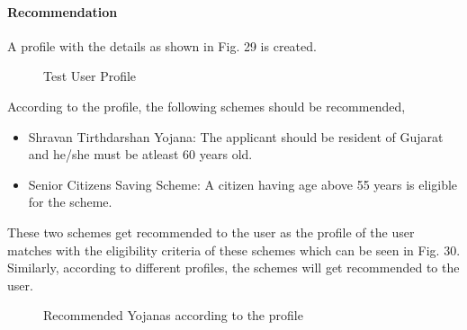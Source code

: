 \documentclass[conference]{IEEEtran}
\begin{document}
\paragraph{Recommendation}
A profile with the details as shown in Fig. 29 is created.
\begin{figure}[h!]
\centering
{}
\caption{Test User Profile}
\end{figure}
According to the profile, the following schemes should be recommended,
\begin{itemize}
    \item Shravan Tirthdarshan Yojana: The applicant should be resident of Gujarat and he/she must be atleast 60 years old.
    \item Senior Citizens Saving Scheme: A citizen having age above 55 years is eligible for the scheme.
\end{itemize}
These two schemes get recommended to the user as the profile of the user matches with the eligibility criteria of these schemes which can be seen in Fig. 30. Similarly, according to different profiles, the schemes will get recommended to the user.
\begin{figure}[h!]
\centering
{}
\caption{Recommended Yojanas according to the profile}
\end{figure}
\end{document}

